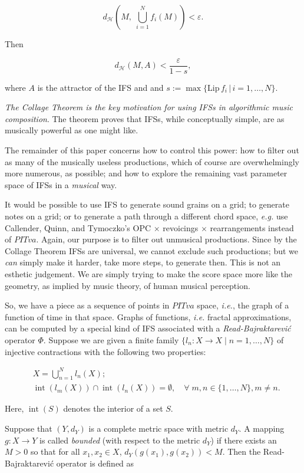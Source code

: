 \documentclass[english,11pt,letterpaper,onecolumn]{scrartcl}
\numberwithin{equation}{section}
\newcommand{\st}{\,|\,}
\newcommand{\calH}{\mathcal{H}}
\newcommand{\Int}{\mathop{\mathrm{int}}}
\begin{document}
\[
d_\calH \left(M, \;\bigcup_{i=1}^N f_i (M) \right) < \varepsilon.
\]

\noindent Then

\[
d_\calH (M, A) < \frac{\varepsilon}{1-s},
\]

\noindent where $A$ is the attractor of the IFS and  and $s :=
\max\{\mathrm{Lip}\,f_i\st
i = 1, \ldots, N\}$.

\textit{The Collage Theorem is the key motivation for using IFSs in
algorithmic music composition}. The theorem proves that IFSs, while
conceptually simple, are as musically powerful as one might like.

The remainder of this paper concerns how to control this power: how to
filter out as many of the musically useless productions, which of course are
overwhelmingly more numerous, as possible; and how to explore the
remaining vast parameter space of IFSs in a \textit{musical} way.

It would be possible to use IFS to generate sound grains on a grid; to
generate notes on a grid; or to generate a path through a different chord
space, \textit{e.g.} use Callender, Quinn, and Tymoczko's OPC $\times$
revoicings $\times$ rearrangements instead of $PITva$. Again, our purpose is
to filter out unmusical productions. Since by the Collage Theorem IFSs are
universal, we cannot exclude such productions; but we \textit{can} simply make
it harder, take more steps, to generate then. This is not an esthetic
judgement. We are simply trying to make the score space more like the
geometry, as implied by music theory, of human musical perception.

So, we have a piece as a sequence of points in $PITva$ space, \textit{i.e.},
the graph of a function of time in that space. Graphs of functions,
\textit{i.e.} fractal approximations, can be computed by a special kind of IFS
associated with a \textit{Read-Bajraktarevi\'c} operator $\Phi$. Suppose we
are given a finite family $\{l_n : X\to X \mid n = 1, \ldots, N\}$ of
injective contractions with the following two properties:

\begin{align}
&X = \bigcup_{n=1}^N l_n(X);\label{union}\\
&\Int (l_m(X))\cap \Int(l_n(X)) = \emptyset, \quad\forall\;m, n\in \{1,\ldots,
N\}, m\neq n.\label{partition}
\end{align}

\noindent Here, $\Int (S)$ denotes the interior of a set $S$.

Suppose that $(Y,d_Y)$ is a complete metric space with metric $d_Y$. A mapping
$g:X\to Y$ is called \emph{bounded} (with respect to the metric $d_Y$) if
there exists an $M> 0$ so that for all $x_1, x_2\in X$, $d_Y(g(x_1),g(x_2)) <
M$. Then the Read-Bajraktarevi\'c operator is defined as
\end{document}
